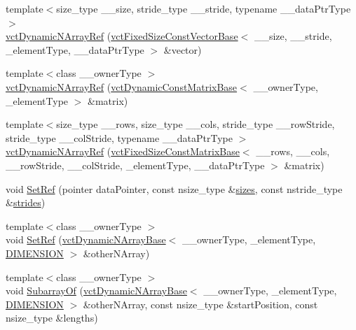 \begin{DoxyCompactItemize}
{\footnotesize template$<$size\+\_\+type \+\_\+\+\_\+size, stride\+\_\+type \+\_\+\+\_\+stride, typename \+\_\+\+\_\+data\+Ptr\+Type $>$ }\\\hyperlink{classvct_dynamic_n_array_ref_a09e261261cb97abb0f5d1f801a82bd56}{vct\+Dynamic\+N\+Array\+Ref} (\hyperlink{classvct_fixed_size_const_vector_base}{vct\+Fixed\+Size\+Const\+Vector\+Base}$<$ \+\_\+\+\_\+size, \+\_\+\+\_\+stride, \+\_\+element\+Type, \+\_\+\+\_\+data\+Ptr\+Type $>$ \&vector)
\item 
{\footnotesize template$<$class \+\_\+\+\_\+owner\+Type $>$ }\\\hyperlink{classvct_dynamic_n_array_ref_affe5937295359867f76f4fd14c6814af}{vct\+Dynamic\+N\+Array\+Ref} (\hyperlink{classvct_dynamic_const_matrix_base}{vct\+Dynamic\+Const\+Matrix\+Base}$<$ \+\_\+\+\_\+owner\+Type, \+\_\+element\+Type $>$ \&matrix)
\item 
{\footnotesize template$<$size\+\_\+type \+\_\+\+\_\+rows, size\+\_\+type \+\_\+\+\_\+cols, stride\+\_\+type \+\_\+\+\_\+row\+Stride, stride\+\_\+type \+\_\+\+\_\+col\+Stride, typename \+\_\+\+\_\+data\+Ptr\+Type $>$ }\\\hyperlink{classvct_dynamic_n_array_ref_a0c88eadb91497258604c2ac6401e1dd2}{vct\+Dynamic\+N\+Array\+Ref} (\hyperlink{classvct_fixed_size_const_matrix_base}{vct\+Fixed\+Size\+Const\+Matrix\+Base}$<$ \+\_\+\+\_\+rows, \+\_\+\+\_\+cols, \+\_\+\+\_\+row\+Stride, \+\_\+\+\_\+col\+Stride, \+\_\+element\+Type, \+\_\+\+\_\+data\+Ptr\+Type $>$ \&matrix)
\item 
void \hyperlink{classvct_dynamic_n_array_ref_a395385ec68aafaea6e60af8bd330eb82}{Set\+Ref} (pointer data\+Pointer, const nsize\+\_\+type \&\hyperlink{classvct_dynamic_const_n_array_base_aa86793343d80325ba5671bc24a2e0e8f}{sizes}, const nstride\+\_\+type \&\hyperlink{classvct_dynamic_const_n_array_base_a6608baee60a448ccb9598417c487cde2}{strides})
\item 
{\footnotesize template$<$class \+\_\+\+\_\+owner\+Type $>$ }\\void \hyperlink{classvct_dynamic_n_array_ref_a8a88ecc7e2f1c68f97581955794de852}{Set\+Ref} (\hyperlink{classvct_dynamic_n_array_base}{vct\+Dynamic\+N\+Array\+Base}$<$ \+\_\+\+\_\+owner\+Type, \+\_\+element\+Type, \hyperlink{group__cisst_vector_gga92161a3e7a42576d3442eaf7bae097c1aa639cdab72a595c9cb324af98946bab5}{D\+I\+M\+E\+N\+S\+I\+O\+N} $>$ \&other\+N\+Array)
\item 
{\footnotesize template$<$class \+\_\+\+\_\+owner\+Type $>$ }\\void \hyperlink{classvct_dynamic_n_array_ref_a19dff24ff49164e8f01db14f6e5d421a}{Subarray\+Of} (\hyperlink{classvct_dynamic_n_array_base}{vct\+Dynamic\+N\+Array\+Base}$<$ \+\_\+\+\_\+owner\+Type, \+\_\+element\+Type, \hyperlink{group__cisst_vector_gga92161a3e7a42576d3442eaf7bae097c1aa639cdab72a595c9cb324af98946bab5}{D\+I\+M\+E\+N\+S\+I\+O\+N} $>$ \&other\+N\+Array, const nsize\+\_\+type \&start\+Position, const nsize\+\_\+type \&lengths)

\end{DoxyCompactItemize}
